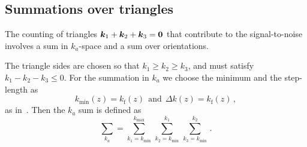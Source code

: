 \subsection{Summations over triangles}

The counting of triangles $\bm {k}_1 + \bm {k}_2 + \bm {k}_3 = \bm{0}$ that contribute to the signal-to-noise involves a sum in $k_a$-space and a sum over orientations.

The triangle sides are chosen so that $k_1\geq k_2 \geq k_3$, and must satisfy $k_1-k_2-k_3\leq 0$.
For the summation in $k_a$ we choose the minimum and the step-length as
\begin{equation}
k_\mathrm{min}(z) = k_\mathrm{f}(z)~~\mbox{and}~~ \Delta k(z)=k_{\mathrm{f}}(z) \,,
\end{equation}
as in~\cite{Karagiannis:2018jdt,Yankelevich:2018uaz}. 
Then the $k_a$ sum is defined as~\cite{Liguori:2010hx,Oddo:2019run}
\begin{equation}
\sum_{k_a} = \sum_{k_{1} = k_\mathrm{min}}^{k_\mathrm{max}} \, \sum_{k_{2}=k_{\mathrm{min}}}^{k_{1}}\,\sum_{k_{3}=k_{\mathrm{min}}}^{k_{2}}
\,.\label{e8}
\end{equation} 

